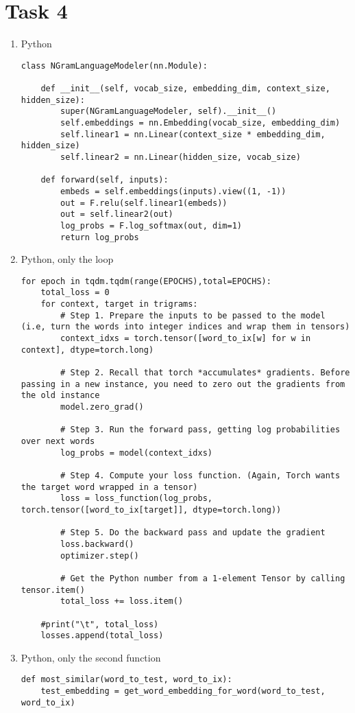 \documentclass{article}
\begin{document}
	\section*{Task 4}
	\begin{enumerate}[label=(\alph*)]
		\item Python
		\begin{lstlisting}[style=Python, tabsize=2]
class NGramLanguageModeler(nn.Module):

	def __init__(self, vocab_size, embedding_dim, context_size, hidden_size):
		super(NGramLanguageModeler, self).__init__()
		self.embeddings = nn.Embedding(vocab_size, embedding_dim)
		self.linear1 = nn.Linear(context_size * embedding_dim, hidden_size)
		self.linear2 = nn.Linear(hidden_size, vocab_size)

	def forward(self, inputs):
		embeds = self.embeddings(inputs).view((1, -1))
		out = F.relu(self.linear1(embeds))
		out = self.linear2(out)
		log_probs = F.log_softmax(out, dim=1)
		return log_probs
		\end{lstlisting}
		\item Python, only the loop
		\begin{lstlisting}[style=Python, tabsize=2]
for epoch in tqdm.tqdm(range(EPOCHS),total=EPOCHS):
	total_loss = 0
	for context, target in trigrams:
		# Step 1. Prepare the inputs to be passed to the model (i.e, turn the words into integer indices and wrap them in tensors)
		context_idxs = torch.tensor([word_to_ix[w] for w in context], dtype=torch.long)
		
		# Step 2. Recall that torch *accumulates* gradients. Before passing in a new instance, you need to zero out the gradients from the old instance
		model.zero_grad()
		
		# Step 3. Run the forward pass, getting log probabilities over next words
		log_probs = model(context_idxs)
		
		# Step 4. Compute your loss function. (Again, Torch wants the target word wrapped in a tensor)
		loss = loss_function(log_probs, torch.tensor([word_to_ix[target]], dtype=torch.long))
		
		# Step 5. Do the backward pass and update the gradient
		loss.backward()
		optimizer.step()
		
		# Get the Python number from a 1-element Tensor by calling tensor.item()
		total_loss += loss.item()
	
	#print("\t", total_loss)
	losses.append(total_loss)
		\end{lstlisting}
		\item Python, only the second function
		\begin{lstlisting}[style=Python, tabsize=2]
def most_similar(word_to_test, word_to_ix):
	test_embedding = get_word_embedding_for_word(word_to_test, word_to_ix)
	

\end{lstlisting}
\end{enumerate}
\end{document}
